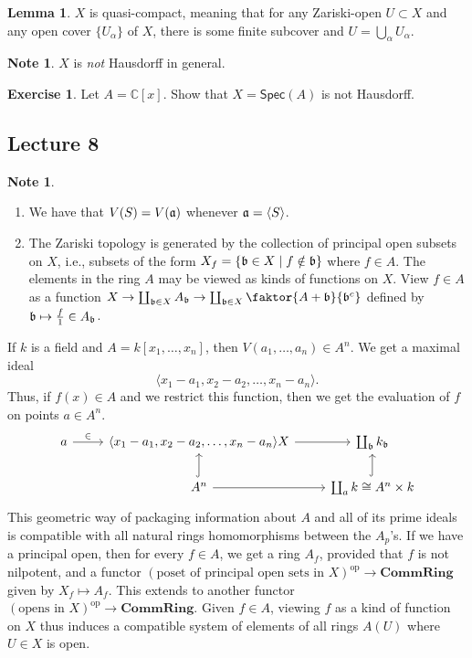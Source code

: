 \documentclass[10pt,letterpaper,cm]{nupset}
\theoremstyle{definition}
\newtheorem{note}[definition]{Note}
\theoremstyle{theorem}
\newtheorem{lemma}[definition]{Lemma}
\newtheorem{exercise}[definition]{Exercise}
\theoremstyle{remark}
\newcommand{\C}{\mathbb C}
\newcommand{\1}{\mathbf{1}}
\newcommand{\0}{\vec 0}
\DeclareMathOperator{\op}{op}
\begin{document}
\begin{lemma}
$X$ is quasi-compact, meaning that for any Zariski-open $U \subset X$ and any open cover $\{U_{\alpha}\}$ of $X$, there is some finite subcover and $U = \bigcup_{\alpha} U_{\alpha}$. 
\end{lemma}

\begin{note}
$X$ is \emph{not} Hausdorff in general. 
\end{note}
\begin{exercise}
Let $A= \C[x]$. Show that $X = \mathsf{Spec}(A)$ is not Hausdorff. 
\end{exercise}

\subsection{Lecture 8}

\begin{note} $ $
\begin{enumerate}
\item We have that $V(S) = V(\frak{a})$ whenever $\frak{a} = \langle S \rangle $.
\item The Zariski topology is generated by the collection of principal open subsets on $X$, i.e., subsets of the form $X_f= \left\{\frak{b} \in X \mid  f\notin \frak{b} \right\}$ where $f\in A$. The elements in the ring $A$ may be viewed as kinds of functions on $X$. View $f\in A$ as a function $X \to \coprod_{\frak{b} \in X} A_{\frak{b}} \to \coprod_{\frak{b} \in X} \faktor{A+{\frak{b}}}{\frak{b}^c}$ defined by $\frak{b} \mapsto \frac{f}{1} \in A_{\frak{b}}$.
\end{enumerate}
\end{note}

\medskip

If $k$ is a field and $A = k[x_1, \ldots, x_n]$, then $V(a_1, \ldots, a_n) \in A^n$. We get a maximal ideal $$\langle x_1 - a_1, x_2 -a_2, \ldots, x_n-a_n \rangle.$$ Thus, if $f(x) \in A$ and we restrict this function, then we get the evaluation of $f$ on points $a\in A^n$.
\[
\begin{tikzcd}
a \arrow[r, "\in"] & {\langle x_1 - a_1, x_2 -a_2, \ldots, x_n-a_n \rangle X} \arrow[r] & \coprod_{\frak{b}} k_{\frak{b}} \\
 & A^n \arrow[r] \arrow[u, hook] & \coprod_{a} k \cong A^n \times k \arrow[u, hook]
\end{tikzcd}
\] 
This geometric way of packaging information about $A$ and all of its prime ideals is compatible with all natural rings homomorphisms between the $A_p$'s. If we have  a principal open, then for every $f\in A$, we get a ring $A_f$, provided that $f$ is not nilpotent, and a functor $\left(\text{poset of principal open sets in } X\right)^{\op} \to \mathbf{CommRing}$ given by $X_f \mapsto A_f$. This extends to another functor $\left(\text{opens in } X\right)^{\op} \to \mathbf{CommRing}$.  Given $f\in A$, viewing $f$ as a kind of function on $X$ thus induces a compatible system of elements of all rings $A(U)$ where $U\in X$ is open. 
\end{document}
